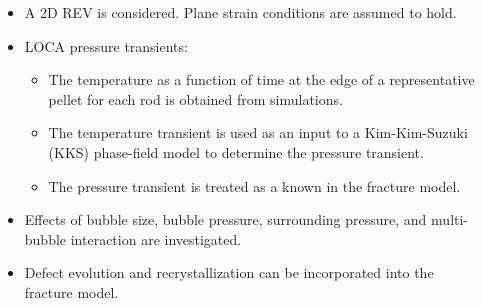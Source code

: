 \begin{frame}
\begin{columns}[T]
\begin{column}{0.4\textwidth}
    \end{column}
    \begin{column}{0.4\textwidth}
      \begin{itemize}
        \item A 2D REV is considered. Plane strain conditions are assumed to hold.
        \item LOCA pressure transients:
              \begin{itemize}
                \item The temperature as a function of time at the edge of a representative pellet for each rod is obtained from simulations.
                \item The temperature transient is used as an input to a Kim-Kim-Suzuki (KKS) phase-field model \cite{Aagesen2020} to determine the pressure transient.
                \item The pressure transient is treated as a known in the fracture model.
              \end{itemize}
        \item Effects of \textcolor{peggyblue}{bubble size}, \textcolor{peggyblue}{bubble pressure}, \textcolor{peggyblue}{surrounding pressure}, and \textcolor{peggyblue}{multi-bubble interaction} are investigated.
        \item \textcolor{peggyblue}{Defect evolution} and \textcolor{peggyblue}{recrystallization} can be incorporated into the fracture model.
      \end{itemize}
    \end{column}
  \end{columns}
\end{frame}
